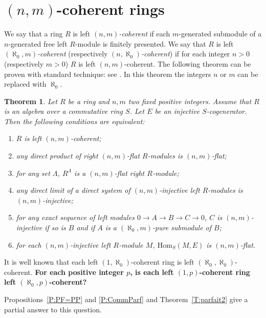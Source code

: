 \documentclass{amsart}
\newtheorem{theorem}{Theorem}[section]
\begin{document}
\section{$(n,m)$-coherent rings}
\label{S:coherent}
We say  that a ring $R$ is left $(n,m)${\it -coherent} if each $m$-generated submodule of a $n$-generated free left $R$-module is finitely presented. We say that $R$ is left $(\aleph_0,m)${\it -coherent} (respectively $(n,\aleph_0)${\it -coherent}) if for each integer $n>0$ (respectively $m>0$) $R$ is left $(n,m)$-coherent. The following theorem can be proven with standard technique: see  \cite[Theorems 5.1 and 5.7]{ZhChZh05}. In this theorem the integers $n$ or $m$ can be replaced with $\aleph_0$.
\begin{theorem}\label{T:coh}
Let $R$ be a ring and $n, m$ two fixed positive integers. Assume that $R$ is an algebra over a commutative ring $S$. Let $E$ be an injective $S$-cogenerator. Then the following conditions are equivalent:
\begin{enumerate}
\item $R$ is left $(n,m)$-coherent;
\item any direct product of right $(n,m)$-flat $R$-modules is $(n,m)$-flat;
\item for any set $\Lambda$, $R^{\Lambda}$ is a $(n,m)$-flat right $R$-module;
\item any direct limit of a direct system of $(n,m)$-injective left $R$-modules is $(n,m)$-injective;
\item for any exact sequence of left modules $0\rightarrow A\rightarrow B\rightarrow C\rightarrow 0$, $C$ is $(n,m)$-injective if so is $B$ and if $A$ is a $(\aleph_0,m)$-pure submodule of $B$;
\item for each $(n,m)$-injective left $R$-module $M$, $\mathrm{Hom}_S(M,E)$ is $(n,m)$-flat.
\end{enumerate}
\end{theorem}


\bigskip
It is well known that each left $(1,\aleph_0)$-coherent ring is left $(\aleph_0,\aleph_0)$-coherent. {\bf For each positive integer $p$, is each left $(1,p)$-coherent ring left $(\aleph_0,p)$-coherent?} 

Propositions~\ref{P:PF=PP} and \ref{P:CommParf} and Theorem~\ref{T:parfait2} give a partial answer to this question.
\end{document}
